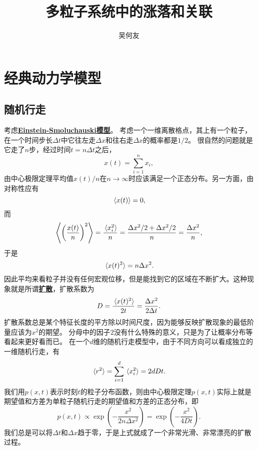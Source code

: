 \documentclass[hyperref, UTF8, a4paper]{ctexart}
\title{多粒子系统中的涨落和关联}
\author{吴何友}
\newcommand{\concept}[1]{\underline{\textbf{#1}}}
\begin{document}
\maketitle

\section{经典动力学模型}

\subsection{随机行走}

考虑\concept{Einstein-Smoluchauski模型}。 %
考虑一个一维离散格点，其上有一个粒子，在一个时间步长$\Delta t$中它往左走$\Delta x$和往右走$\Delta x$的概率都是$1/2$。
很自然的问题就是它走了$n$步，经过时间$t=n \Delta t$之后，
\[
    x(t) = \sum_{i=1}^n x_i,
\]
由中心极限定理平均值$x(t)/n$在$n \to \infty$时应该满足一个正态分布。另一方面，由对称性应有
\begin{equation}
    \expval*{x(t)} = 0,
\end{equation}
而
\[
    \expval{\left( \frac{x(t)}{n} \right)^2} = \frac{\expval*{x_i^2}}{n} = \frac{\Delta x^2 / 2 + \Delta x^2 / 2}{n} = \frac{\Delta x^2}{n},
\]
于是
\begin{equation}
    \expval*{x(t)^2} = n \Delta x^2.
\end{equation}
因此平均来看粒子并没有任何宏观位移，但是能找到它的区域在不断扩大。这种现象就是所谓\concept{扩散}，扩散系数为
\begin{equation}
    D = \frac{\expval*{x(t)^2}}{2 t} = \frac{\Delta x^2}{2 \Delta t}.
\end{equation}
扩散系数总是某个特征长度的平方除以时间尺度，因为能够反映扩散现象的最低阶量应该为$x^2$的期望。
分母中的因子$2$没有什么特殊的意义，只是为了让概率分布等看起来更好看而已。
在一个$d$维的随机行走模型中，由于不同方向可以看成独立的一维随机行走，有
\begin{equation}
    \expval*{r^2} = \sum_{i=1}^d \expval*{x_i^2} = 2 d D t.
\end{equation}
我们用$p(x, t)$表示时刻$t$的粒子分布函数，则由中心极限定理$p(x, t)$实际上就是期望值和方差为单粒子随机行走的期望值和方差的正态分布，即
\begin{equation}
    p(x, t) \propto \exp(-\frac{x^2}{2 n \Delta x^2}) = \exp(- \frac{x^2}{4 D t}).
\end{equation}
我们总是可以将$\Delta t$和$\Delta x$趋于零，于是上式就成了一个非常光滑、非常漂亮的扩散过程。
\end{document}
